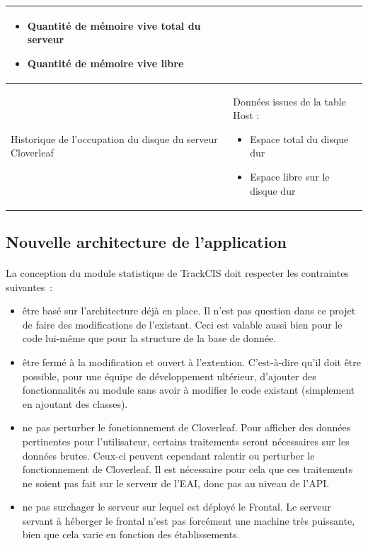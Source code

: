 \begin{table}[H]
\begin{tabular}{| p{5cm} | p{8cm} |}
\begin{itemize}
						  \item Quantité de mémoire vive total du serveur
						  \item Quantité de mémoire vive libre
						\end{itemize}
						\\
					\hline
						Historique de l'occupation du disque du serveur Cloverleaf
						&
						Données issues de la table Host :
						\begin{itemize}
						  \item Espace total du disque dur
						  \item Espace libre sur le disque dur
						\end{itemize}
						\\
					\hline
				\end{tabular}
			\end{table}
		
		
		\subsection{Nouvelle architecture de l'application}
			\paragraph{}%
			La conception du module statistique de TrackCIS doit respecter les
			contraintes suivantes~:
			\begin{itemize}%
			  \item être basé sur l'architecture déjà en place. Il n'est pas question
			  dans ce projet de faire des modifications de l'existant. Ceci est
			  valable aussi bien pour le code lui-même que pour la structure de la base
			  de donnée.
			  \item être fermé à la modification et ouvert à l'extention. C'est-à-dire
			  qu'il doit être possible, pour une équipe de développement ultérieur,
			  d'ajouter des fonctionnalités au module sans avoir à modifier le code
			  existant (simplement en ajoutant des classes).
			  \item ne pas perturber le fonctionnement de Cloverleaf. Pour afficher des
			  données pertinentes pour l'utilisateur, certains traitements seront
			  nécessaires sur les données brutes. Ceux-ci peuvent cependant ralentir ou
			  perturber le fonctionnement de Cloverleaf. Il est nécessaire pour cela que
			  ces traitements ne soient pas fait sur le serveur de l'EAI, donc pas au
			  niveau de l'API.
			  \item ne pas surchager le serveur sur lequel est déployé le Frontal. Le
			  serveur servant à héberger le frontal n'est pas forcément une machine très
			  puissante, bien que cela varie en fonction des établissements.
			\end{itemize}
			
